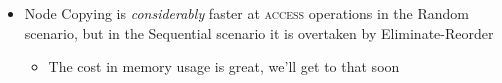 \documentclass[compress]{beamer}
\begin{document}
\begin{frame}
\begin{columns}[t]
  \begin{column}{0.50\textwidth}
    \begin{itemize}

      \item Node Copying is \textit{considerably} faster at \textsc{access}
      operations in the Random scenario, but in the Sequential scenario it is
      overtaken by Eliminate-Reorder

      \begin{itemize}
        \item The cost in memory usage is great, we'll get to that soon
      \end{itemize}

    \end{itemize}
  \end{column}
\end{columns}
\end{frame}
\end{document}
